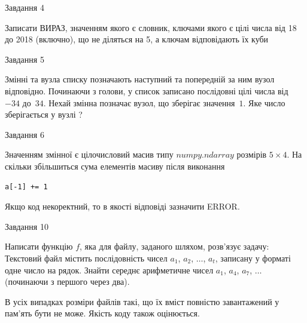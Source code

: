 \documentclass[12pt, ukrainian]{article}
\begin{document}
{               
{\begin{center}Завдання {4}\end{center}}
\vspace{-6mm}
Записати ВИРАЗ, значенням якого є словник, ключами якого є цілі числа від 18 до 2018 (включно), що не діляться на 5, а ключам відповідають їх куби\par

\vspace{10mm}
               
{\begin{center}Завдання {5}\end{center}}
\vspace{-6mm}
Змінні  та  вузла списку позначають наступний та попередній за ним вузол відповідно. Починаючи з голови, у список записано послідовні цілі числа від~$-34$ до~$34$. Нехай змінна  позначає вузол, що зберігає значення~$1$.
Яке число зберігається у вузлі  ?\par

               
{\begin{center}Завдання {6}\end{center}}
\vspace{-6mm}
Значенням змінної  є цілочисловий масив типу $numpy.ndarray$ розмірів $5{\times}4$. На скільки збільшиться сума елементів масиву  після виконання
\begin{verbatim}
a[-1] += 1
\end{verbatim}


Якщо код некоректний, то в якості відповіді зазначити ERROR.\par

               
{\begin{center}Завдання {10}\end{center}}
\vspace{-6mm}

Написати функцію $f$, яка для файлу, заданого шляхом, розв’язує задачу:\\ Текстовий файл містить послідовність чисел $a_1$, $a_2$, $\ldots$, $a_t$, записану у форматі одне число на рядок. Знайти середнє арифметичне чисел $a_1$, $a_4$, $a_7$, $\ldots$ (починаючи з першого через два).

В усіх випадках розміри файлів такі, що їх вміст повністю завантажений у пам'ять бути не може. Якість коду також оцінюється.



\vspace{10mm}\par

}
\end{document}
